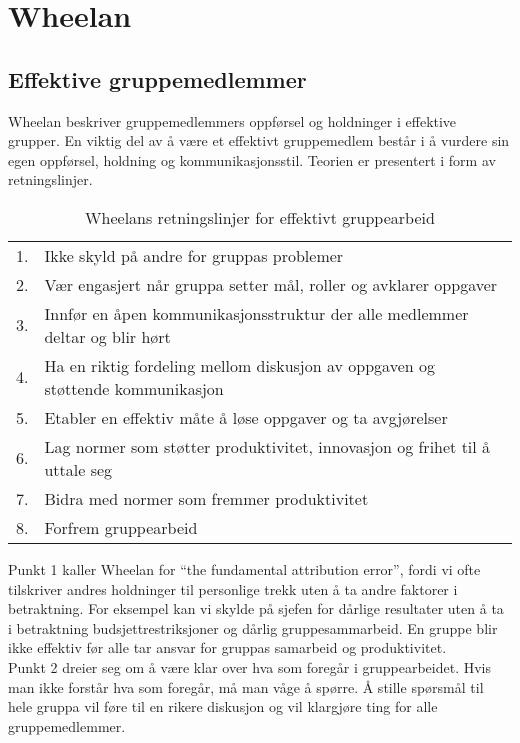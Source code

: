 \section{Wheelan}
\subsection{Effektive gruppemedlemmer}

Wheelan beskriver gruppemedlemmers oppførsel og holdninger i effektive grupper.
En viktig del av å være et effektivt gruppemedlem består i å vurdere sin egen
oppførsel, holdning og kommunikasjonsstil. Teorien er presentert i form av retningslinjer. 

\begin{center}
\begin{table}[ht!]
\begin{tabular}{r l}
1. & Ikke skyld på andre for gruppas problemer \\
2. & Vær engasjert når gruppa setter mål, roller og avklarer oppgaver \\
3. & Innfør en åpen kommunikasjonsstruktur der alle medlemmer deltar og blir
hørt \\
4. & Ha en riktig fordeling mellom diskusjon av oppgaven og støttende
kommunikasjon \\
5. & Etabler en effektiv måte å løse oppgaver og ta
avgjørelser \\
6. & Lag normer som støtter produktivitet, innovasjon og frihet til å uttale
seg \\
7. & Bidra med normer som fremmer produktivitet \\
8. & Forfrem gruppearbeid
\end{tabular}
\caption{Wheelans retningslinjer for effektivt gruppearbeid}
\label{tab:Wheelan}
\end{table}
\end{center}

Punkt 1 kaller Wheelan for ``the fundamental attribution error'', fordi vi ofte
tilskriver andres holdninger til personlige trekk uten å ta andre faktorer i
betraktning. For eksempel kan vi skylde på sjefen for dårlige resultater uten å
ta i betraktning budsjettrestriksjoner og dårlig gruppesammarbeid. En gruppe
blir ikke effektiv før alle tar ansvar for gruppas samarbeid og produktivitet.
\\

Punkt 2 dreier seg om å være klar over hva som foregår i gruppearbeidet. Hvis man ikke forstår hva som foregår, må man våge å spørre. Å stille spørsmål til hele gruppa vil føre til en rikere diskusjon og vil klargjøre ting for alle gruppemedlemmer. \\

